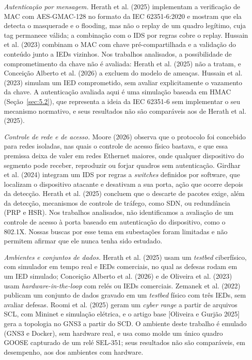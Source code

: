 \documentclass[12pt]{article}
\newcommand{\cit}[2]{[#1]\nocite{#2}}
\newcommand{\citn}[2]{#1\nocite{#2}}
\begin{document}
\emph{Autenticação por mensagem.} \citn{Herath et al. (2025)}{herath2025evaluation} implementam a verificação de MAC com AES-GMAC-128 no formato da IEC 62351-6:2020 e mostram que ela detecta o masquerade e o flooding, mas não o replay de um quadro legítimo, cuja tag permanece válida; a combinação com o IDS por regras cobre o replay. \citn{Hussain et al. (2023)}{hussain2023hybrid} combinam o MAC com chave pré-compartilhada e a validação do conteúdo junto a IEDs vizinhos. Nos trabalhos analisados, a possibilidade de comprometimento da chave não é avaliada: \citn{Herath et al. (2025)}{herath2025evaluation} não a tratam, e \citn{Conceição Alberto et al. (2026)}{alberto2026gooseidrs} a excluem do modelo de ameaças. \citn{Hussain et al. (2023)}{hussain2023hybrid} simulam um IED comprometido, sem avaliar explicitamente o vazamento da chave. A autenticação avaliada aqui é uma simulação baseada em HMAC (Seção~\ref{sec:5.2}), que representa a ideia da IEC 62351-6 sem implementar o seu mecanismo normativo, e seus resultados não são comparáveis aos de \citn{Herath et al. (2025)}{herath2025evaluation}.

\emph{Controle de rede e de acesso.} \citn{Moore (2026)}{moore2026anomaly} observa que o protocolo foi concebido para redes isoladas, nas quais o controle de acesso físico bastava, e que essa premissa deixa de valer em redes Ethernet maiores, onde qualquer dispositivo do segmento pode receber, reproduzir ou forjar quadros sem autenticação. \citn{Girdhar et al. (2024)}{girdhar2024sdn} integram um IDS por regras a \emph{switches} definidos por software, que localizam o dispositivo atacante e desativam a sua porta, ação que ocorre depois da detecção. \citn{Herath et al. (2025)}{herath2025evaluation} concluem que o descarte de pacotes exige, além da detecção, mecanismos de controle de tráfego, como SDN, ou redundância (PRP e HSR). Nos trabalhos analisados, não identificamos a avaliação de um controle de acesso à porta baseado em autenticação do dispositivo, como o 802.1X. Nossas buscas por esse tema em subestações foram limitadas e não permitem afirmar que ele nunca tenha sido estudado.

\emph{Ambientes e conjuntos de dados.} \citn{Herath et al. (2025)}{herath2025evaluation} usam um \emph{testbed} ciberfísico, com simulador em tempo real e IEDs comerciais, no qual as defesas rodam em um IED simulado; \citn{Conceição Alberto et al. (2026)}{alberto2026gooseidrs} e \citn{de Oliveira et al. (2023)}{oliveira2023ataques} usam \emph{hardware-in-the-loop} com relés ou IEDs comerciais. \citn{Zemanek et al. (2022)}{zemanek2022powerduck} publicam um conjunto de dados gravado em um \emph{testbed} físico com três IEDs, sem avaliar defesas. \citn{Roomi et al. (2025)}{roomi2025autosgcr} geram um \emph{cyber range} a partir de arquivos SCL, com Mininet e simulação elétrica, e o artigo base \cit{Oliveira e Gurjão 2025}{oliveira2025analisador} gera a topologia no GNS3 a partir do SCD. O ambiente deste trabalho é emulado (GNS3 e Docker), sem hardware real, e usa como molde um único quadro GOOSE capturado de um relé SEL-351; seus resultados não são comparáveis, em desempenho, aos dos ambientes com hardware.
\end{document}
